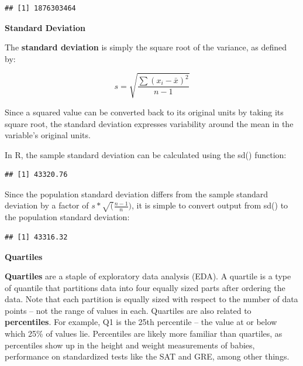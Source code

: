 \documentclass[]{book}
\newenvironment{Shaded}{\begin{snugshade}}{\end{snugshade}}
\newcommand{\CommentTok}[1]{\textcolor[rgb]{0.56,0.35,0.01}{\textit{#1}}}
\newcommand{\DecValTok}[1]{\textcolor[rgb]{0.00,0.00,0.81}{#1}}
\newcommand{\KeywordTok}[1]{\textcolor[rgb]{0.13,0.29,0.53}{\textbf{#1}}}
\newcommand{\NormalTok}[1]{#1}
\newcommand{\OperatorTok}[1]{\textcolor[rgb]{0.81,0.36,0.00}{\textbf{#1}}}
\newcommand{\StringTok}[1]{\textcolor[rgb]{0.31,0.60,0.02}{#1}}
\begin{document}
\begin{verbatim}
## [1] 1876303464
\end{verbatim}

\textbf{Standard Deviation}

The \textbf{standard deviation} is simply the square root of the variance, as defined by:

\[ s = \sqrt{\frac{\sum (x_{i} - \bar{x})^{2}}{n - 1}} \]

Since a squared value can be converted back to its original units by taking its square root, the standard deviation expresses variability around the mean in the variable's original units.

In R, the sample standard deviation can be calculated using the sd() function:

\begin{Shaded}
\end{Shaded}

\begin{verbatim}
## [1] 43320.76
\end{verbatim}

Since the population standard deviation differs from the sample standard deviation by a factor of \(s * \sqrt (\frac{n - 1}{n})\), it is simple to convert output from sd() to the population standard deviation:

\begin{Shaded}
\end{Shaded}

\begin{verbatim}
## [1] 43316.32
\end{verbatim}

\textbf{Quartiles}

\textbf{Quartiles} are a staple of exploratory data analysis (EDA). A quartile is a type of quantile that partitions data into four equally sized parts after ordering the data. Note that each partition is equally sized with respect to the number of data points -- not the range of values in each. Quartiles are also related to \textbf{percentiles}. For example, Q1 is the 25th percentile -- the value at or below which 25\% of values lie. Percentiles are likely more familiar than quartiles, as percentiles show up in the height and weight measurements of babies, performance on standardized tests like the SAT and GRE, among other things.
\end{document}

